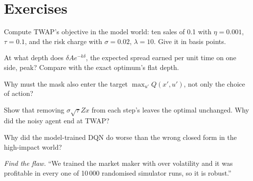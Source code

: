 \section{Exercises}

\begin{exercise}[$\star$]\label{exo:ml:reinforcement-learning-for-execution-and-market-making:1}
Compute TWAP's objective in the model world: ten sales of 0.1 with $\eta = 0.001$, $\tau = 0.1$, and the risk charge with
$\sigma = 0.02$, $\lambda = 10$. Give it in basis points.
\end{exercise}

\begin{exercise}[$\star$]\label{exo:ml:reinforcement-learning-for-execution-and-market-making:2}
At what depth does $\delta Ae^{-k\delta}$, the expected spread earned per unit time on one side, peak? Compare with the exact
optimum's flat depth.
\end{exercise}

\begin{exercise}[$\star$]\label{exo:ml:reinforcement-learning-for-execution-and-market-making:3}
Why must the mask also enter the target $\max_{u'}Q(x', u')$, not only the choice of action?
\end{exercise}

\begin{exercise}[$\star\star$]\label{exo:ml:reinforcement-learning-for-execution-and-market-making:4}
Show that removing $\sigma\sqrt\tau Zx$ from each step's  leaves the optimal  unchanged. Why did the noisy agent
end at TWAP?
\end{exercise}

\begin{exercise}[$\star\star$]\label{exo:ml:reinforcement-learning-for-execution-and-market-making:5}
Why did the model-trained DQN do worse than the wrong closed form in the high-impact world?
\end{exercise}

\begin{exercise}[$\star\star$]\label{exo:ml:reinforcement-learning-for-execution-and-market-making:6}
\emph{Find the flaw.} ``We trained the market maker with  over volatility and it was profitable in every
one of 10\,000 randomised simulator runs, so it is robust.''
\end{exercise}

